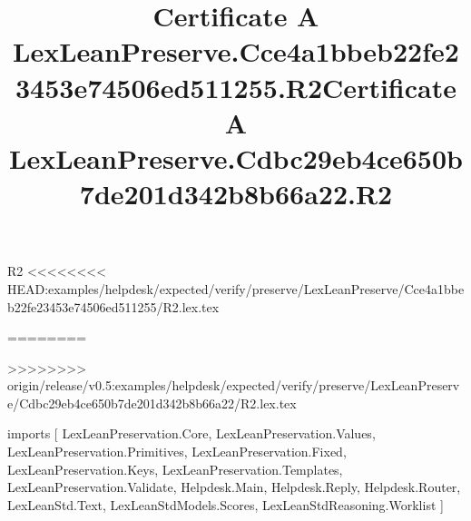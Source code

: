 \begin{lexlean}{R2}
<<<<<<<< HEAD:examples/helpdesk/expected/verify/preserve/LexLeanPreserve/Cce4a1bbeb22fe23453e74506ed511255/R2.lex.tex
\title{Certificate A LexLeanPreserve.Cce4a1bbeb22fe23453e74506ed511255.R2}
========
\title{Certificate A LexLeanPreserve.Cdbc29eb4ce650b7de201d342b8b66a22.R2}
>>>>>>>> origin/release/v0.5:examples/helpdesk/expected/verify/preserve/LexLeanPreserve/Cdbc29eb4ce650b7de201d342b8b66a22/R2.lex.tex
\begin{coremodule}
imports [
  LexLeanPreservation.Core,
  LexLeanPreservation.Values,
  LexLeanPreservation.Primitives,
  LexLeanPreservation.Fixed,
  LexLeanPreservation.Keys,
  LexLeanPreservation.Templates,
  LexLeanPreservation.Validate,
  Helpdesk.Main,
  Helpdesk.Reply,
  Helpdesk.Router,
  LexLeanStd.Text,
  LexLeanStdModels.Scores,
  LexLeanStdReasoning.Worklist
]


\end{coremodule}
\end{lexlean}
